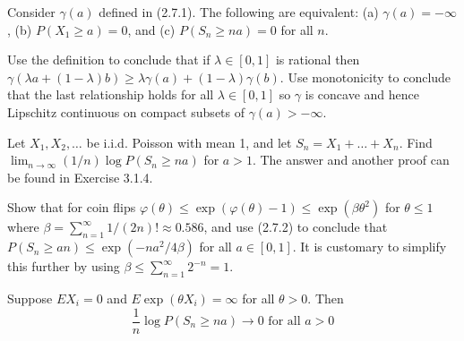   \begin{exercise}[Durrett 2.7.1]
    Consider $\gamma(a)$ defined in (2.7.1). The following are equivalent: (a) $\gamma(a) = -\infty$, (b) $P(X_1 \geq a) = 0$, and (c) $P(S_n \geq na) = 0$ for all $n$.
  \end{exercise}
  \begin{solution}

  \end{solution}

  \begin{exercise}[Durrett 2.7.2]
    Use the definition to conclude that if $\lambda \in [0, 1]$ is rational then $\gamma(\lambda a + (1 - \lambda)b) \geq \lambda \gamma(a) + (1 - \lambda) \gamma(b)$. Use monotonicity to conclude that the last relationship holds for all $\lambda \in [0, 1]$ so $\gamma$ is concave and hence Lipschitz continuous on compact subsets of $\gamma(a) > -\infty$.
  \end{exercise}
  \begin{solution}

  \end{solution}

  \begin{exercise}[Durrett 2.7.3]
    Let $X_1, X_2, \dots$ be i.i.d. Poisson with mean 1, and let $S_n = X_1 + \dots + X_n$. Find $\lim_{n \to \infty} (1/n) \log P(S_n \geq na)$ for $a > 1$. The answer and another proof can be found in Exercise 3.1.4.
  \end{exercise}
  \begin{solution}

  \end{solution}

  \begin{exercise}[Durrett 2.7.4]
    Show that for coin flips $\varphi(\theta) \leq \exp(\varphi(\theta) - 1) \leq \exp(\beta\theta^2)$ for $\theta \leq 1$ where $\beta = \sum_{n=1}^{\infty} 1/(2n)! \approx 0.586$, and use (2.7.2) to conclude that $P(S_n \geq an) \leq \exp(-na^2/4\beta)$ for all $a \in [0, 1]$. It is customary to simplify this further by using $\beta \leq \sum_{n=1}^{\infty} 2^{-n} = 1$.
  \end{exercise}
  \begin{solution}

  \end{solution}

  \begin{exercise}[Durrett 2.7.5]
    Suppose $EX_i = 0$ and $E \exp(\theta X_i) = \infty$ for all $\theta > 0$. Then
    \begin{equation*}
      \frac{1}{n} \log P(S_n \geq na) \to 0 \text{ for all } a > 0
    \end{equation*}
  \end{exercise}
  \begin{solution}

  \end{solution}

